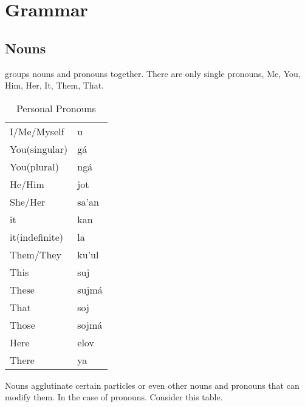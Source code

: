 \chapter*{Grammar }

\section*{Nouns}

\klingonl groups nouns and pronouns together. There are only single pronouns, Me, You, Him, Her, It, Them, That.\par


\begin{table}[ht]
	\caption{Personal Pronouns}
	\centering
	\begin{tabular}{ l l }
		\toprule
		\english				& 	\klingonl 		\\
		\midrule
		I/Me/Myself 			&	u 				\\
		You(singular) 			&	g\'{a} 			\\
		You(plural) 			&	ng\'{a} 		\\
		He/Him 					&	jot 			\\
		She/Her 				&	sa'an 			\\
		it 						&	kan 			\\
		it(indefinite) 			&	la 				\\
		Them/They 				&	ku'ul 			\\
		This 					&	suj 			\\
		These 					&	sujm\'{a} 		\\
		That 					&	soj 			\\
		Those 					&	sojm\'{a} 		\\
		Here 					&	elov 			\\
		There 					&	ya 				\\
		\bottomrule
	\end{tabular}
	\label{table:personal_pronouns}
\end{table}

Nouns agglutinate certain particles or even other nouns and pronouns that can modify them. In the case of pronouns. Consider this table.\par

